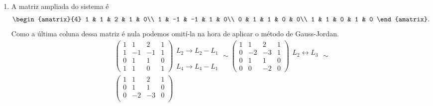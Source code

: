 \begin{exemplo}
\begin{solucao}
\begin{enumerate}
            \item A matriz ampliada do sistema é
                \[
                    \begin{amatrix}{4}
                        1 & 1 & 2 & 1 & 0\\
                        1 & -1 & -1 & 1 & 0\\
                        0 & 1 & 1 & 0 & 0\\
                        1 & 1 & 0 & 1 & 0
                    \end{amatrix}.
                \]
            Como a última coluna dessa matriz é nula podemos omití-la na hora de aplicar o método de Gauss-Jordan.
            \begin{align*}
                &\begin{pmatrix}
                    1 & 1 & 2 & 1\\
                    1 & -1 & -1 & 1\\
                    0 & 1 & 1 & 0\\
                    1 & 1 & 0 & 1
                \end{pmatrix}
                \begin{array}{l}
                    \phantom{x}\\L_2 \to L_2 - L_1\\\phantom{x}\\L_4 \to L_4 - L_1
                \end{array}\sim
                \begin{pmatrix}
                    1 & 1 & 2 & 1\\
                    0 & -2 & -3 & 1\\
                    0 & 1 & 1 & 0\\
                    0 & 0 & -2 & 0
                \end{pmatrix}
                \begin{array}{l}
                    \phantom{x}\\L_2 \leftrightarrow L_3\\\phantom{x}\\\phantom{x}
                \end{array}\sim\\
                &\begin{pmatrix}
                    1 & 1 & 2 & 1\\
                    0 & 1 & 1 & 0\\
                    0 & -2 & -3 & 0\\

\end{pmatrix}
\end{align*}
\end{enumerate}
\end{solucao}
\end{exemplo}
